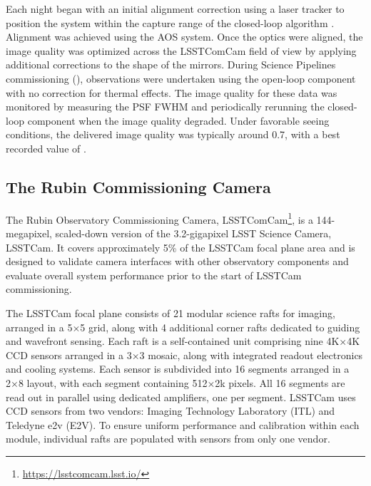 Each night began with an initial alignment correction using a laser tracker to position the system within the capture range of the closed-loop algorithm \citep{10.1117/12.3019031}. 
Alignment was achieved using the AOS system.
Once the optics were aligned, the image quality was optimized across the LSSTComCam field of view by applying additional corrections to the shape of the mirrors. 
During Science Pipelines commissioning (), observations were undertaken using the open-loop component with no correction for thermal effects. 
The image quality for these data was monitored by measuring the PSF FWHM and periodically rerunning the closed-loop component when the image quality degraded. 
Under favorable seeing conditions, the delivered image quality was typically around {0.7\arcsec\xspace}, with a best 
recorded value of \bestimagequality.

\subsection{The Rubin Commissioning Camera
\label{ssec:comcam}}
The Rubin Observatory Commissioning Camera, LSSTComCam\footnote{\url{https://lsstcomcam.lsst.io/}}, is a 144-megapixel, scaled-down version of the 3.2-gigapixel LSST Science Camera, LSSTCam. 
It covers approximately 5\% of the LSSTCam focal plane area and is designed to validate camera interfaces with other observatory components and evaluate overall system performance prior to the start of LSSTCam commissioning.

The LSSTCam focal plane consists of 21 modular science rafts for imaging, arranged in a 5×5 grid, along with 4 additional corner rafts dedicated to guiding and wavefront sensing. 
Each raft is a self-contained unit comprising nine 4K×4K CCD sensors arranged in a 3×3 mosaic, along with integrated readout electronics and cooling systems. 
Each sensor is subdivided into 16 segments arranged in a 2×8 layout, with each segment containing 512×2k pixels. 
All 16 segments are read out in parallel using dedicated amplifiers, one per segment. 
LSSTCam uses CCD sensors from two vendors: Imaging Technology Laboratory (ITL) and Teledyne e2v (E2V). 
To ensure uniform performance and calibration within each module, individual rafts are populated with sensors from only one vendor. 

